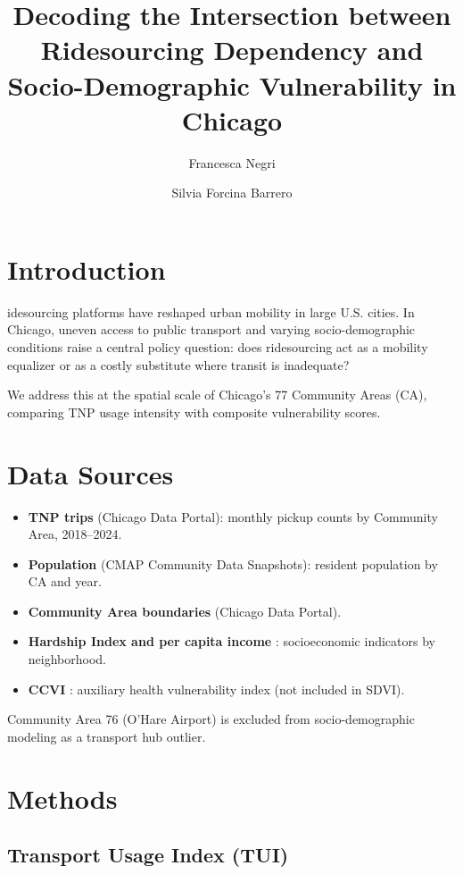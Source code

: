 \documentclass[9pt,a4paper,twocolumn,twoside]{rho-class/rho}
\title{Decoding the Intersection between Ridesourcing Dependency and Socio-Demographic Vulnerability in Chicago}
\author[{\textasteriskcentered},a,1]{Francesca Negri}
\author[{\textdagger},a,2]{Silvia Forcina Barrero}
\affil[a]{Data Science Lab on Smart Cities, University of Milan-Bicocca}
\begin{document}
    \maketitle
    \thispagestyle{firststyle}

\section{Introduction}

    idesourcing platforms have reshaped urban mobility in large U.S. cities. In Chicago, uneven access to public transport and varying socio-demographic conditions raise a central policy question: does ridesourcing act as a mobility equalizer or as a costly substitute where transit is inadequate?

    We address this at the spatial scale of Chicago's 77 Community Areas (CA), comparing TNP usage intensity with composite vulnerability scores.

\section{Data Sources}

    \begin{itemize}
        \item \textbf{TNP trips} (Chicago Data Portal): monthly pickup counts by Community Area, 2018--2024.
        \item \textbf{Population} (CMAP Community Data Snapshots): resident population by CA and year.
        \item \textbf{Community Area boundaries} (Chicago Data Portal).
        \item \textbf{Hardship Index and per capita income} \cite{chicago_hardship}: socioeconomic indicators by neighborhood.
        \item \textbf{CCVI} \cite{chicago_ccvi}: auxiliary health vulnerability index (not included in SDVI).
    \end{itemize}

    Community Area 76 (O'Hare Airport) is excluded from socio-demographic modeling as a transport hub outlier.

\section{Methods}

    \subsection{Transport Usage Index (TUI)}
\end{document}
